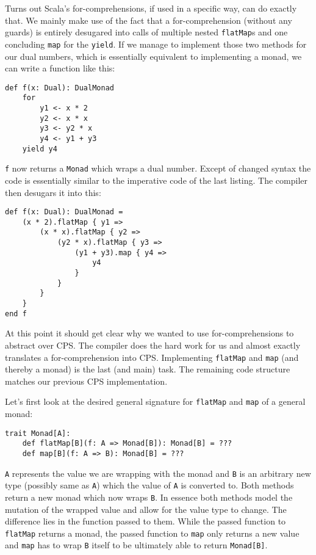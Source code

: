Turns out Scala's for-comprehensions, if used in a specific way, can do exactly that. We mainly make use of the fact that a for-comprehension (without any guards) is entirely desugared into calls of multiple nested \lstinline{flatMap}s and one concluding \lstinline{map} for the \lstinline{yield}. If we manage to implement those two methods for our dual numbers, which is essentially equivalent to implementing a monad, we can write a function like this:
\begin{lstlisting}
def f(x: Dual): DualMonad
    for
        y1 <- x * 2
        y2 <- x * x
        y3 <- y2 * x
        y4 <- y1 + y3
    yield y4    
\end{lstlisting}
\lstinline{f} now returns a \lstinline{Monad} which wraps a dual number. Except of changed syntax the code is essentially similar to the imperative code of the last listing. The compiler then desugars it into this:
\begin{lstlisting}[caption={Desugared for-comprehension}, label={lst:desugaredForComprehension}]
def f(x: Dual): DualMonad =
    (x * 2).flatMap { y1 =>
        (x * x).flatMap { y2 =>
            (y2 * x).flatMap { y3 =>
                (y1 + y3).map { y4 =>
                    y4
                }
            }
        }
    }
end f  
\end{lstlisting}
At this point it should get clear why we wanted to use for-comprehensions to abstract over CPS. The compiler does the hard work for us and almost exactly translates a for-comprehension into CPS. Implementing \lstinline{flatMap} and \lstinline{map} (and thereby a monad) is the last (and main) task. The remaining code structure matches our previous CPS implementation.

Let's first look at the desired general signature for \lstinline{flatMap} and \lstinline{map} of a general monad:
\begin{lstlisting}
trait Monad[A]:
    def flatMap[B](f: A => Monad[B]): Monad[B] = ???
    def map[B](f: A => B): Monad[B] = ???
\end{lstlisting}
\lstinline{A} represents the value we are wrapping with the monad and \lstinline{B} is an arbitrary new type (possibly same as \lstinline{A}) which the value of \lstinline{A} is converted to. Both methods return a new monad which now wraps \lstinline{B}. In essence both methods model the mutation of the wrapped value and allow for the value type to change. The difference lies in the function passed to them. While the passed function to \lstinline{flatMap} returns a monad, the passed function to \lstinline{map} only returns a new value and \lstinline{map} has to wrap \lstinline{B} itself to be ultimately able to return \lstinline{Monad[B]}. 

